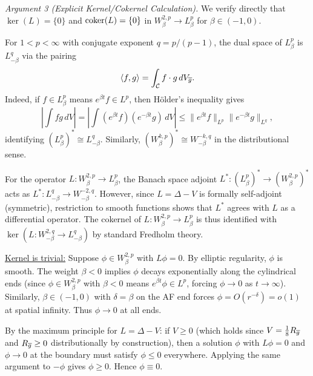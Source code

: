 \textit{Argument 3 (Explicit Kernel/Cokernel Calculation).}
We verify directly that $\ker(L) = \{0\}$ and $\mathrm{coker}(L) = \{0\}$ in $W^{2,p}_\beta \to L^p_\beta$ for $\beta \in (-1,0)$.

\begin{remark}\label{rem:WeightedDuality}
For $1 < p < \infty$ with conjugate exponent $q = p/(p-1)$, the dual space of $L^p_\beta$ is $L^q_{-\beta}$ via the pairing
\[
    \langle f, g \rangle = \int_{\mathcal{C}} f \cdot g \, dV_{\overline{g}}.
\]
Indeed, if $f \in L^p_\beta$ means $e^{\beta t} f \in L^p$, then H\"older's inequality gives
\[
    \left| \int fg \, dV \right| = \left| \int (e^{\beta t} f)(e^{-\beta t} g) \, dV \right| \le \|e^{\beta t} f\|_{L^p} \|e^{-\beta t} g\|_{L^q},
\]
identifying $(L^p_\beta)^* \cong L^q_{-\beta}$. Similarly, $(W^{k,p}_\beta)^* \cong W^{-k,q}_{-\beta}$ in the distributional sense.

For the operator $L: W^{2,p}_\beta \to L^p_\beta$, the Banach space adjoint $L^*: (L^p_\beta)^* \to (W^{2,p}_\beta)^*$ acts as $L^*: L^q_{-\beta} \to W^{-2,q}_{-\beta}$. However, since $L = \Delta - V$ is formally self-adjoint (symmetric), restriction to smooth functions shows that $L^*$ agrees with $L$ as a differential operator. The cokernel of $L: W^{2,p}_\beta \to L^p_\beta$ is thus identified with $\ker(L: W^{2,q}_{-\beta} \to L^q_{-\beta})$ by standard Fredholm theory.
\end{remark}

\underline{Kernel is trivial:} Suppose $\phi \in W^{2,p}_\beta$ with $L\phi = 0$. By elliptic regularity, $\phi$ is smooth. The weight $\beta < 0$ implies $\phi$ decays exponentially along the cylindrical ends (since $\phi \in W^{2,p}_\beta$ with $\beta < 0$ means $e^{\beta t}\phi \in L^p$, forcing $\phi \to 0$ as $t \to \infty$). Similarly, $\beta \in (-1,0)$ with $\delta = \beta$ on the AF end forces $\phi = O(r^{-\delta}) = o(1)$ at spatial infinity. Thus $\phi \to 0$ at all ends.

By the maximum principle for $L = \Delta - V$: if $V \ge 0$ (which holds since $V = \frac{1}{8}R_{\overline{g}}$ and $R_{\overline{g}} \ge 0$ distributionally by construction), then a solution $\phi$ with $L\phi = 0$ and $\phi \to 0$ at the boundary must satisfy $\phi \le 0$ everywhere. Applying the same argument to $-\phi$ gives $\phi \ge 0$. Hence $\phi \equiv 0$.

